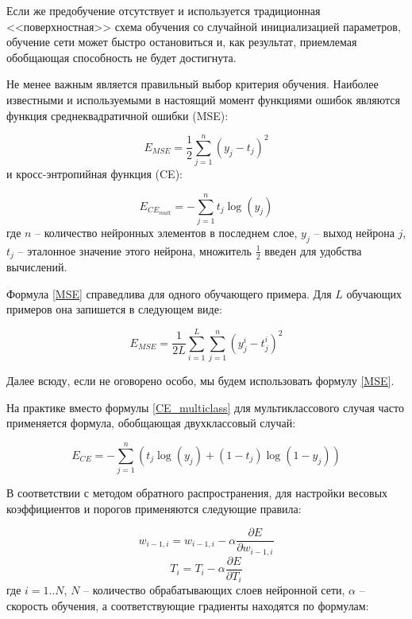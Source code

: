 Если же предобучение отсутствует и используется традиционная <<поверхностная>> схема обучения со случайной инициализацией параметров, обучение сети может быстро остановиться и, как результат, приемлемая обобщающая способность не будет достигнута.

Не менее важным является правильный выбор критерия обучения. Наиболее известными и используемыми в настоящий момент функциями ошибок являются функция среднеквадратичной ошибки (MSE):

\begin{equation}
	\label{MSE}
	E_{MSE} = \frac{1}{2}\sum_{j=1}^{n}(y_j - t_j)^2
\end{equation}
и кросс-энтропийная функция (CE):

\begin{equation}
	\label{CE_multiclass}
	E_{CE_{mult}} = -\sum_{j=1}^{n}t_j\log(y_j)
\end{equation}
где $n$ -- количество нейронных элементов в последнем слое, $y_j$ -- выход нейрона $j$, $t_j$ -- эталонное значение этого нейрона, множитель $\frac{1}{2}$ введен для удобства вычислений.

Формула \ref{MSE} справедлива для одного обучающего примера. Для $L$ обучающих примеров она запишется в следующем виде:

\begin{equation}
	\label{MSE_L}
	E_{MSE} = \frac{1}{2L}\sum_{i=1}^{L}\sum_{j=1}^{n}(y_j^i - t_j^i)^2	
\end{equation}

Далее всюду, если не оговорено особо, мы будем использовать формулу \ref{MSE}.

На практике вместо формулы \ref{CE_multiclass} для мультиклассового случая часто применяется формула, обобщающая двухклассовый случай:

\begin{equation}
	\label{CE}
	E_{CE} = -\sum_{j=1}^n(t_j\log(y_j) + (1-t_j)\log(1-y_j))
\end{equation}

В соответствии с методом обратного распространения, для настройки весовых коэффициентов и порогов применяются следующие правила:

\begin{equation}
	w_{i-1,i} = w_{i-1, i} - \alpha \frac{\partial E}{\partial w_{i-1, i}}
\end{equation}
\begin{equation}
	T_i = T_i - \alpha \frac{\partial E}{\partial T_i}
\end{equation}
где $i=1..N$, $N$ -- количество обрабатывающих слоев нейронной сети, $\alpha$ -- скорость обучения, а соответствующие градиенты находятся по формулам:

